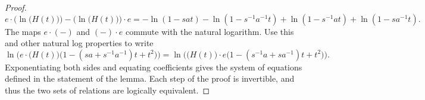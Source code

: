 \begin{proof}
\begin{equation}
e \cdot \Big( \ln\big(H(t)\big) \Big) - \big( \ln \big(H(t)\big) \Big) \cdot e = - \ln(1 - sat) - \ln(1 - s^{-1}a^{-1}t) + \ln(1 - s^{-1}at) + \ln(1 - sa^{-1}t).
\end{equation}
The maps $e \cdot (-)$ and $(-) \cdot e$ commute with the natural logarithm. Use this and other natural log properties to write
\begin{equation}
\ln\Big( e \cdot \big( H(t) \big) \big( 1 - (sa + s^{-1}a^{-1})t + t^2 \big) \Big) = \ln\Big( \big( H(t) \big) \cdot e \big( 1 - (s^{-1}a + sa^{-1})t + t^2 \big) \Big).
\end{equation}
Exponentiating both sides and equating coefficients gives the system of equations defined in the statement of the lemma. Each step of the proof is invertible, and thus the two sets of relations are logically equivalent.
\end{proof}

